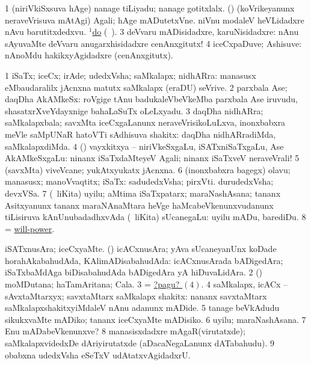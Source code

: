 \noindent
\gl{\pagu}
\expl{}
\bmng
\bnum
\num{1}  (niriVkiSxsuva hAge) nanage tiLiyadu; nanage gotitxlalx. 
  (\AmA) 
\banum
{} (koVrikeyanunx neraveVrisuva mAtAgi) Agali; hAge mADutetxVne.  niVnu modaleV heVLidadxre nAvu barutitxdedxvu. 
  \hyperref{kandict_d.pdf}{D}{do(1) nuga(34)}{$^1$do} (\pagu\ ). 
\eanum
\numie
\num{3}  deVvaru mADisidadxre, karuNisidadxre:  nAnu sAyuvaMte deVvaru anugarxhisidadxre cenAnxgitutx! 
\num{4}  iceCxpaDuve; Ashisuve:  nAnoMdu hakikxyAgidadxre (cenAnxgitutx). 
\enum
\emng
\eentry

\bentry
{} 
\gl{\nA}
\bmng
\bnum
\num{1} iSaTx; iceCx; irAde; udedxVsha; saMkalapx; nidhARra:  manasusx eMbaudaralilx jAcnxna matutx saMkalapx (eraDU) seVrive. 
\num{2} parxbala Ase; daqDha AkAMkeSx:  roVgige tAnu badukaleVbeVkeMba parxbala Ase iruvudu, shasatxrXveYdayxnige bahaLaSuTx oLeLxyadu. 
\num{3} daqDha nidhARra; saMkalapxbala; savxMta iceCxgaLanunx neraveVrisikoLuLxva, inonxbabxra meVle saMpUNaR hatoVTi sAdhisuva shakitx:  daqDha nidhARradiMda, saMkalapxdiMda. 
\num{4} (\pArxparx) vayxkitxya -- niriVkeSxgaLu, iSATxniSaTxgaLu, Ase AkAMkeSxgaLu:  ninanx iSaTxdaMteyeV Agali; ninanx iSaTxveV neraveVrali! 
\num{5} (savxMta) viveVcane; yukAtxyukatx jAcnxna. 
\num{6} (inonxbabxra bagegx) olavu; manasusx; manoVvaqtitx; iSaTx:  sadudedxVsha; pirxVti.  durudedxVsha; devxVSa. 
\num{7} (\sA\ liKita) uyilu; aMtima iSaTxpatarx; maraNashAsana; tananx Asitxyanunx tananx maraNAnaMtara heVge haMcabeVkenunxvudanunx tiLisiruva kAnUnubadadhxvAda (\sA\ liKita) sUcanegaLu:  uyilu mADu, barediDu. 
\num{8} = \hyperlink{will-power}{will-power}. 
\enum
\emng

\noindent
\gl{\pagu}
\bmng
\bnum
{}  
\banum
{} iSATxnusAra; iceCxyaMte. 
 (\nAyxshA) icACxnusAra; yAva sUcaneyanUnx koDade horahAkabahudAda, KAlimADisabahudAda:  icACxnusArada bADigedAra; iSaTxbaMdAga biDisabahudAda bADigedAra yA hiDuvaLidAra. 
\eanum
\numie
\num{2}  (\sw) moMDutana; haTamAritana; Cala. 
\num{3}  = \hyperlink{will pagu4}{?pagu? \((4)\)}. 
\hypertarget{will pagu4}{} 
\num{4}  saMkalapx, icACx -- sAvxtaMtarxyx; savxtaMtarx saMkalapx shakitx:  nananx savxtaMtarx saMkalapxshakitxyiMdaleV nAnu adanunx mADide. 
\num{5}  tanage beVkAdudu sikukxvaMte mADiko; tananx iceCxyaMte mADisiko. 
\num{6}  uyilu; maraNashAsana. 
\num{7}  Enu mADabeVkenunxve? 
\num{8}  manasisxdadxre mAgaR(virutatxde); saMkalapxvidedxDe dAriyirutatxde (aDacaNegaLanunx dATabahudu). 
\num{9}  obabxna udedxVsha eSeTxV udAtatxvAgidadxrU. 
\enum
\emng
\eentry

